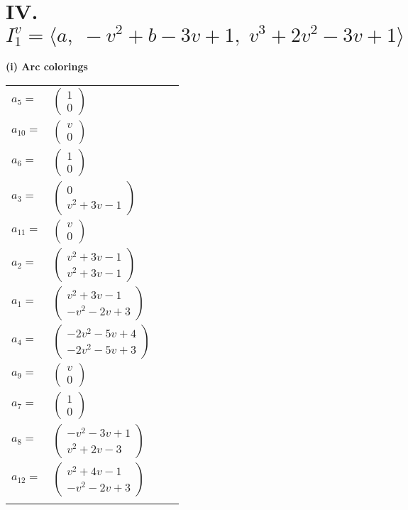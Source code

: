 \documentclass[1p]{elsarticle_modified}
\theoremstyle{definition}
\begin{document}
\centering \section*{IV. $I^v_{1}= \langle a,\;- v^2+b-3 v+1,\;v^3+2 v^2-3 v+1 \rangle$}
\flushleft \textbf{(i) Arc colorings}\\
\begin{tabular}{m{7pt} m{180pt} m{7pt} m{180pt} }
\flushright $a_{5}=$&$\begin{pmatrix}1\\0\end{pmatrix}$ \\
\flushright $a_{10}=$&$\begin{pmatrix}v\\0\end{pmatrix}$ \\
\flushright $a_{6}=$&$\begin{pmatrix}1\\0\end{pmatrix}$ \\
\flushright $a_{3}=$&$\begin{pmatrix}0\\v^2+3 v-1\end{pmatrix}$ \\
\flushright $a_{11}=$&$\begin{pmatrix}v\\0\end{pmatrix}$ \\
\flushright $a_{2}=$&$\begin{pmatrix}v^2+3 v-1\\v^2+3 v-1\end{pmatrix}$ \\
\flushright $a_{1}=$&$\begin{pmatrix}v^2+3 v-1\\- v^2-2 v+3\end{pmatrix}$ \\
\flushright $a_{4}=$&$\begin{pmatrix}-2 v^2-5 v+4\\-2 v^2-5 v+3\end{pmatrix}$ \\
\flushright $a_{9}=$&$\begin{pmatrix}v\\0\end{pmatrix}$ \\
\flushright $a_{7}=$&$\begin{pmatrix}1\\0\end{pmatrix}$ \\
\flushright $a_{8}=$&$\begin{pmatrix}- v^2-3 v+1\\v^2+2 v-3\end{pmatrix}$ \\
\flushright $a_{12}=$&$\begin{pmatrix}v^2+4 v-1\\- v^2-2 v+3\end{pmatrix}$\\&\end{tabular}
\end{document}
